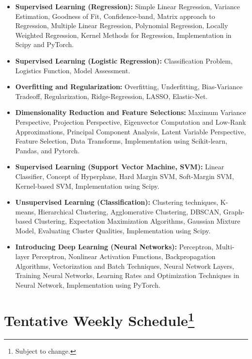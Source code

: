 \documentclass[11pt,oneside,openany]{book}
\newcommand{\topiclead}[1]{\textbf{\textcolor{deep}{#1}}}%
\begin{document}
\begin{itemize}
    \item \topiclead{Supervised Learning (Regression):} Simple Linear Regression, Variance Estimation, Goodness of Fit, Confidence-band, Matrix approach to Regression, Multiple Linear Regression, Polynomial Regression, Locally Weighted Regression, Kernel Methods for Regression, Implementation in Scipy and PyTorch.
    \item \topiclead{Supervised Learning (Logistic Regression):} Classification Problem, Logistics Function, Model Assessment.
    \item \topiclead{Overfitting and Regularization:} Overfitting, Underfitting, Bias-Variance Tradeoff, Regularization, Ridge-Regression, LASSO, Elastic-Net.
    \item \topiclead{Dimensionality Reduction and Feature Selections:} Maximum Variance Perspective, Projection Perspective, Eigenvector Computation and Low-Rank Approximations, Principal Component Analysis, Latent Variable Perspective, Feature Selection, Data Transforms, Implementation using Scikit-learn, Pandas, and Pytorch.
    \item \topiclead{Supervised Learning (Support Vector Machine, SVM):} Linear Classifier, Concept of Hyperplane, Hard Margin SVM, Soft-Margin SVM, Kernel-based SVM, Implementation using Scipy.
    \item \topiclead{Unsupervised Learning (Classification):} Clustering techniques, K-means, Hierarchical Clustering, Agglomerative Clustering, DBSCAN, Graph-based Clustering, Expectation Maximization Algorithms, Gaussian Mixture Model, Evaluating Cluster Qualities, Implementation using Scipy.
    \item \topiclead{Introducing Deep Learning (Neural Networks):} Perceptron, Multi-layer Perceptron, Nonlinear Activation Functions, Backpropagation Algorithms, Vectorization and Batch Techniques, Neural Network Layers, Training Neural Networks, Learning Rates and Optimization Techniques in Neural Network, Implementation using PyTorch.
\end{itemize}

\section*{Tentative Weekly Schedule\footnote{Subject to change.}}
\end{document}
